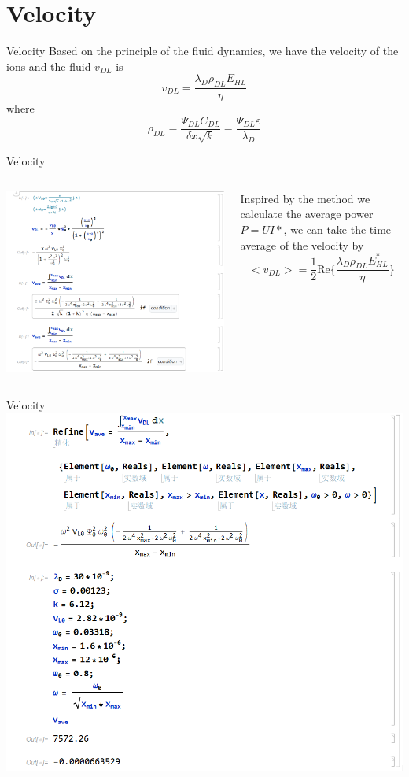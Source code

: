 \documentclass[12pt]{beamer}
\begin{document}
\section{Velocity}
\begin{frame}{Velocity}
    Based on the principle of the fluid dynamics, we have the velocity of the ions and the fluid $v_{DL}$ is\\
    \[v_{DL}=\frac{\lambda_D\rho_{DL}E_{HL}}{\eta}\]
    where\\
    \[\rho_{DL}=\frac{\Psi_{DL}C_{DL}}{\delta x\sqrt{k}}=\frac{\Psi_{DL}\varepsilon}{\lambda_D}\]
\end{frame}
\begin{frame}{Velocity}
    \begin{columns}[onlytextwidth]
        \begin{column}{0.55\textwidth}
            \includegraphics[width=\columnwidth]{3.png}
        \end{column}
        \begin{column}{0.4\textwidth}
            Inspired by the method we calculate the average power $P=UI*$, we can take the time average of the velocity by\\
            \[<v_{DL}>=\frac{1}{2}\mathrm{Re}\{\frac{\lambda_D\rho_{DL}E_{HL}^*}{\eta}\}\]
        \end{column}
    \end{columns}
\end{frame}
\begin{frame}{Velocity}
    \includegraphics[width=0.6\linewidth]{4.png}
\end{frame}
\end{document}
